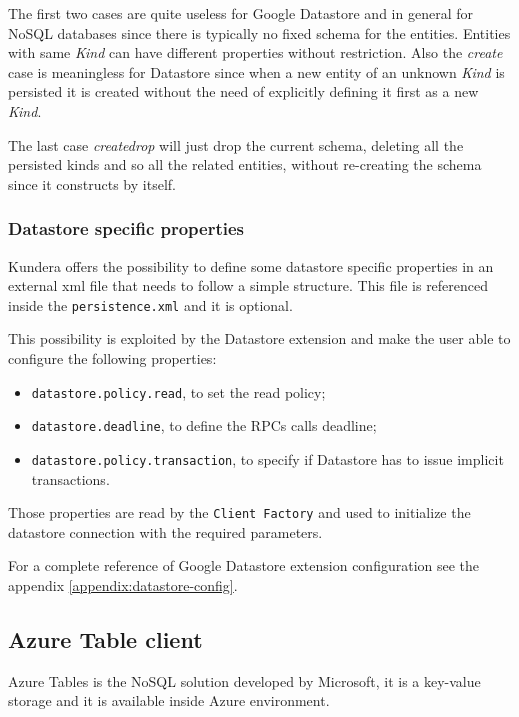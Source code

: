 \noindent The first two cases are quite useless for Google Datastore and in general for NoSQL databases since there is typically no fixed schema for the entities. Entities with same \textit{Kind} can have different properties without restriction.
Also the \textit{create} case is meaningless for Datastore since when a new entity of an unknown \textit{Kind} is persisted it is created without the need of explicitly defining it first as a new \textit{Kind}.

\noindent The last case \textit{create\textunderscore drop} will just drop the current schema, deleting all the persisted kinds and so all the related entities, without re-creating the schema since it constructs by itself.

\subsubsection{Datastore specific properties}
Kundera offers the possibility to define some datastore specific properties in an external xml file that needs to follow a simple structure. This file is referenced inside the \texttt{persistence.xml} and it is optional.

\newparagraph This possibility is exploited by the Datastore extension and make the user able to configure the following properties:
\begin{itemize}
\item \texttt{datastore.policy.read}, to set the read policy;
\item \texttt{datastore.deadline}, to define the RPCs calls deadline;
\item \texttt{datastore.policy.transaction}, to specify if Datastore has to issue implicit transactions.
\end{itemize}
Those properties are read by the \texttt{Client Factory} and used to initialize the datastore connection with the required parameters.

\newparagraph For a complete reference of Google Datastore extension configuration see the appendix \ref{appendix:datastore-config}.

\subsection{Azure Table client}
\label{sec:kundera-table}
Azure Tables \cite{online:azuretable} is the NoSQL solution developed by Microsoft, it is a key-value storage and it is available inside Azure environment.

